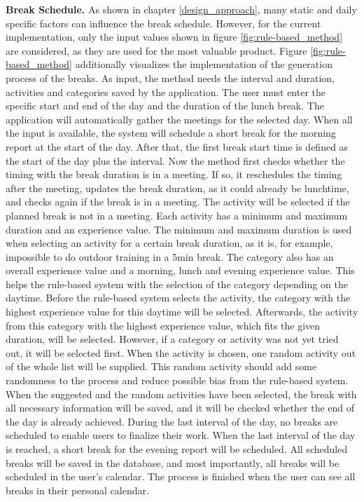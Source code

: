 \documentclass{hasel_thesis}
\begin{document}
\textbf{Break Schedule.} As shown in chapter \ref{design_approach}, many static and daily specific factors can influence the break schedule. However, for the current implementation, only the input values shown in figure \ref{fig:rule-based_method} are considered, as they are used for the most valuable product. Figure \ref{fig:rule-based_method} additionally visualizes the implementation of the generation process of the breaks. As input, the method needs the interval and duration, activities and categories saved by the application. The user must enter the specific start and end of the day and the duration of the lunch break. The application will automatically gather the meetings for the selected day. When all the input is available, the system will schedule a short break for the morning report at the start of the day. After that, the first break start time is defined as the start of the day plus the interval. Now the method first checks whether the timing with the break duration is in a meeting. If so, it reschedules the timing after the meeting, updates the break duration, as it could already be lunchtime, and checks again if the break is in a meeting. The activity will be selected if the planned break is not in a meeting. Each activity has a minimum and maximum duration and an experience value. The minimum and maximum duration is used when selecting an activity for a certain break duration, as it is, for example, impossible to do outdoor training in a 5min break. The category also has an overall experience value and a morning, lunch and evening experience value. This helps the rule-based system with the selection of the category depending on the daytime. Before the rule-based system selects the activity, the category with the highest experience value for this daytime will be selected. Afterwards, the activity from this category with the highest experience value, which fits the given duration, will be selected. However, if a category or activity was not yet tried out, it will be selected first. When the activity is chosen, one random activity out of the whole list will be supplied. This random activity should add some randomness to the process and reduce possible bias from the rule-based system. When the suggested and the random activities have been selected, the break with all necessary information will be saved, and it will be checked whether the end of the day is already achieved. During the last interval of the day, no breaks are scheduled to enable users to finalize their work. When the last interval of the day is reached, a short break for the evening report will be scheduled. All scheduled breaks will be saved in the database, and most importantly, all breaks will be scheduled in the user's calendar. The process is finished when the user can see all breaks in their personal calendar.
\end{document}
